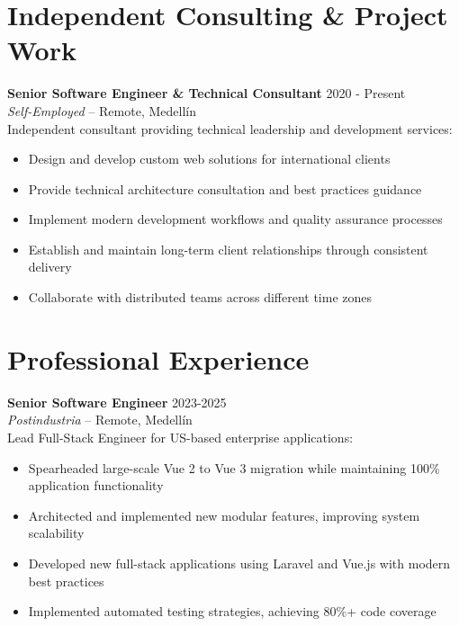 \documentclass[11pt,a4paper]{article}
\begin{document}
\section*{Independent Consulting \& Project Work}
\textbf{Senior Software Engineer \& Technical Consultant} \hfill 2020 - Present\\
\textit{Self-Employed} -- Remote, Medellín\\
Independent consultant providing technical leadership and development services:
\begin{itemize}[noitemsep]
  \item Design and develop custom web solutions for international clients
  \item Provide technical architecture consultation and best practices guidance
  \item Implement modern development workflows and quality assurance processes
  \item Establish and maintain long-term client relationships through consistent delivery
  \item Collaborate with distributed teams across different time zones
\end{itemize}

\section*{Professional Experience}

\noindent\textbf{Senior Software Engineer} \hfill 2023-2025\\
\textit{Postindustria} -- Remote, Medellín\\
Lead Full-Stack Engineer for US-based enterprise applications:
\begin{itemize}[noitemsep]
  \item Spearheaded large-scale Vue 2 to Vue 3 migration while maintaining 100\% application functionality
  \item Architected and implemented new modular features, improving system scalability
  \item Developed new full-stack applications using Laravel and Vue.js with modern best practices
  \item Implemented automated testing strategies, achieving 80\%+ code coverage
\end{itemize}
\end{document}
